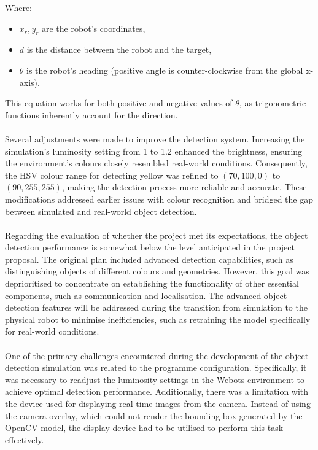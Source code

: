 Where:
\begin{itemize}
    \item \(x_r, y_r\) are the robot's coordinates,
    \item \(d\) is the distance between the robot and the target,
    \item \(\theta\) is the robot's heading (positive angle is counter-clockwise from the global x-axis).
\end{itemize}
This equation works for both positive and negative values of \(\theta\), as trigonometric functions inherently account for the direction.

\paragraph*{}
Several adjustments were made to improve the detection system. Increasing the simulation's luminosity setting from 1 to 1.2 enhanced the brightness, ensuring the environment's colours closely resembled real-world conditions. Consequently, the HSV colour range for detecting yellow was refined to \((70, 100, 0)\) to \((90, 255, 255)\), making the detection process more reliable and accurate. These modifications addressed earlier issues with colour recognition and bridged the gap between simulated and real-world object detection.

\paragraph*{}
Regarding the evaluation of whether the project met its expectations, the object detection performance is somewhat below the level anticipated in the project proposal. The original plan included advanced detection capabilities, such as distinguishing objects of different colours and geometries. However, this goal was deprioritised to concentrate on establishing the functionality of other essential components, such as communication and localisation. The advanced object detection features will be addressed during the transition from simulation to the physical robot to minimise inefficiencies, such as retraining the model specifically for real-world conditions.

\paragraph*{}
One of the primary challenges encountered during the development of the object detection simulation was related to the programme configuration. Specifically, it was necessary to readjust the luminosity settings in the Webots environment to achieve optimal detection performance. Additionally, there was a limitation with the device used for displaying real-time images from the camera. Instead of using the camera overlay, which could not render the bounding box generated by the OpenCV model, the display device had to be utilised to perform this task effectively.

